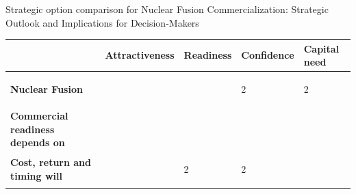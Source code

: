\documentclass[10pt,a4paper]{article}
\begin{document}
{\small\color{BOText} Strategic option comparison for Nuclear Fusion Commercialization: Strategic Outlook and Implications for Decision-Makers}\par\vspace{4pt}
{\scriptsize\begin{tabular}{p{38mm}>{\centering\arraybackslash}p{21mm}>{\centering\arraybackslash}p{21mm}>{\centering\arraybackslash}p{21mm}>{\centering\arraybackslash}p{21mm}}
 & {\bfseries Attractiveness} & {\bfseries Readiness} & {\bfseries Confidence} & {\bfseries Capital need} \\
\hline
{\bfseries Nuclear Fusion} & \colorbox{BOGreen}{\textcolor{white}{\strut\hspace{5pt}5\hspace{5pt}}} & \colorbox{BOBlue}{\textcolor{white}{\strut\hspace{5pt}3\hspace{5pt}}} & \colorbox{BOLight}{\textcolor{BOText}{\strut\hspace{5pt}2\hspace{5pt}}} & \colorbox{BOLight}{\textcolor{BOText}{\strut\hspace{5pt}2\hspace{5pt}}} \\
{\bfseries Commercial readiness depends on} & \colorbox{BOGreen}{\textcolor{white}{\strut\hspace{5pt}4\hspace{5pt}}} & \colorbox{BOGreen}{\textcolor{white}{\strut\hspace{5pt}4\hspace{5pt}}} & \colorbox{BOBlue}{\textcolor{white}{\strut\hspace{5pt}3\hspace{5pt}}} & \colorbox{BOBlue}{\textcolor{white}{\strut\hspace{5pt}3\hspace{5pt}}} \\
{\bfseries Cost, return and timing will} & \colorbox{BOGreen}{\textcolor{white}{\strut\hspace{5pt}4\hspace{5pt}}} & \colorbox{BOLight}{\textcolor{BOText}{\strut\hspace{5pt}2\hspace{5pt}}} & \colorbox{BOLight}{\textcolor{BOText}{\strut\hspace{5pt}2\hspace{5pt}}} & \colorbox{BOGreen}{\textcolor{white}{\strut\hspace{5pt}4\hspace{5pt}}} \\

\end{tabular}}
\end{document}
